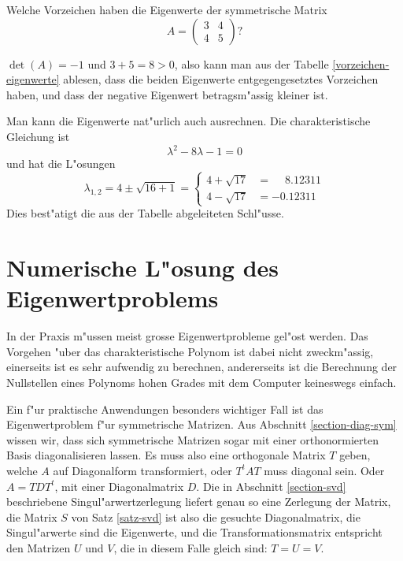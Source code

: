 \begin{beispiel}[Zahlenbeispiel]
Welche Vorzeichen haben die Eigenwerte der symmetrische Matrix
\[
A=\begin{pmatrix}
3&4\\
4&5
\end{pmatrix}?
\]

\smallskip
{\parindent 0pt $\det(A)=-1$ und $3+5=8>0$, also kann man aus der
Tabelle \ref{vorzeichen-eigenwerte}
ablesen, dass die beiden Eigenwerte entgegengesetztes
Vorzeichen haben, und dass der negative Eigenwert betragsm"assig
kleiner ist.}

Man kann die Eigenwerte nat"urlich auch ausrechnen.
Die charakteristische Gleichung ist 
\[
\lambda^2-8\lambda-1=0
\]
und hat die L"osungen
\[
\lambda_{1,2}=4\pm\sqrt{16+1}=\begin{cases}
4+\sqrt{17}&=\phantom{-}8.12311\\
4-\sqrt{17}&=-0.12311
\end{cases}
\]
Dies best"atigt die aus der Tabelle abgeleiteten Schl"usse.
\end{beispiel}

\section{Numerische L"osung des Eigenwertproblems}
In der Praxis m"ussen meist grosse Eigenwertprobleme gel"ost werden.
Das Vorgehen "uber das charakteristische Polynom ist dabei nicht zweckm"assig,
einerseits ist es sehr aufwendig zu berechnen, andererseits ist die
Berechnung der Nullstellen eines Polynoms hohen Grades mit dem Computer
keineswegs einfach.

Ein f"ur praktische Anwendungen besonders wichtiger Fall ist
das Eigenwertproblem f"ur symmetrische Matrizen.
Aus Abschnitt \ref{section-diag-sym} wissen wir, dass sich symmetrische
Matrizen sogar mit einer orthonormierten Basis diagonalisieren lassen.
Es muss also eine orthogonale Matrix $T$ geben, welche $A$ auf
Diagonalform transformiert, oder $T^tAT$ muss diagonal sein.
Oder $A=TDT^t$, mit einer Diagonalmatrix $D$.
Die in Abschnitt \ref{section-svd} beschriebene Singul"arwertzerlegung
liefert genau so eine Zerlegung der Matrix, die Matrix $S$ von 
Satz \ref{satz-svd} ist also die gesuchte Diagonalmatrix, die
Singul"arwerte sind die Eigenwerte, und die Transformationsmatrix
entspricht den Matrizen $U$ und $V$, die in diesem Falle gleich sind:
$T=U=V$.

